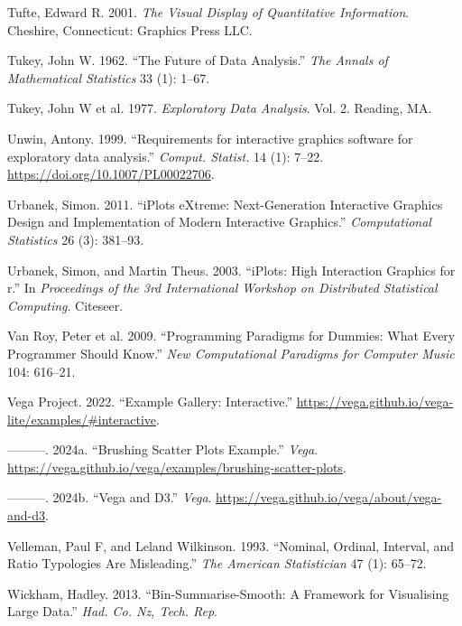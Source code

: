 \documentclass[
]{book}
\newlength{\cslhangindent}
\newenvironment{CSLReferences}[2] %
 {\begin{list}{}{%
  \setlength{\itemindent}{0pt}
  \setlength{\leftmargin}{0pt}
  \setlength{\parsep}{0pt}
  \ifodd #1
   \setlength{\leftmargin}{\cslhangindent}
   \setlength{\itemindent}{-1\cslhangindent}
  \fi
  \setlength{\itemsep}{#2\baselineskip}}}
 {\end{list}}
\theoremstyle{definition}
\theoremstyle{definition}
\theoremstyle{definition}
\theoremstyle{definition}
\theoremstyle{remark}
\begin{document}
\begin{CSLReferences}{1}{0}
Tufte, Edward R. 2001. \emph{The Visual Display of Quantitative Information}. Cheshire, Connecticut: Graphics Press LLC.

Tukey, John W. 1962. {``The Future of Data Analysis.''} \emph{The Annals of Mathematical Statistics} 33 (1): 1--67.

Tukey, John W et al. 1977. \emph{Exploratory Data Analysis}. Vol. 2. Reading, MA.

Unwin, Antony. 1999. {``{Requirements for interactive graphics software for exploratory data analysis}.''} \emph{Comput. Statist.} 14 (1): 7--22. \url{https://doi.org/10.1007/PL00022706}.

Urbanek, Simon. 2011. {``iPlots eXtreme: Next-Generation Interactive Graphics Design and Implementation of Modern Interactive Graphics.''} \emph{Computational Statistics} 26 (3): 381--93.

Urbanek, Simon, and Martin Theus. 2003. {``iPlots: High Interaction Graphics for r.''} In \emph{Proceedings of the 3rd International Workshop on Distributed Statistical Computing}. Citeseer.

Van Roy, Peter et al. 2009. {``Programming Paradigms for Dummies: What Every Programmer Should Know.''} \emph{New Computational Paradigms for Computer Music} 104: 616--21.

Vega Project. 2022. {``{Example Gallery: Interactive}.''} \url{https://vega.github.io/vega-lite/examples/\#interactive}.

---------. 2024a. {``Brushing Scatter Plots Example.''} \emph{Vega}. \url{https://vega.github.io/vega/examples/brushing-scatter-plots}.

---------. 2024b. {``Vega and D3.''} \emph{Vega}. \url{https://vega.github.io/vega/about/vega-and-d3}.

Velleman, Paul F, and Leland Wilkinson. 1993. {``Nominal, Ordinal, Interval, and Ratio Typologies Are Misleading.''} \emph{The American Statistician} 47 (1): 65--72.

Wickham, Hadley. 2013. {``Bin-Summarise-Smooth: A Framework for Visualising Large Data.''} \emph{Had. Co. Nz, Tech. Rep}.


\end{CSLReferences}
\end{document}
